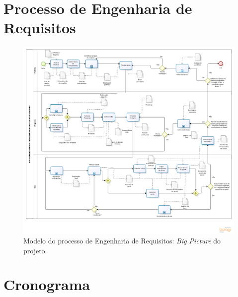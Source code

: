 \begin{apendicesenv}
  
  \chapter{Processo de Engenharia de Requisitos}
  
    \begin{figure}[!htbp]
      \centering
      \includegraphics[scale=0.46, angle = 90]{figuras/project_big_picture}
      \caption[Modelo do processo de Engenharia de Requisitos]
	  {Modelo do processo de Engenharia de Requisitos: \textit{Big Picture} do projeto.}
      \label{project_big_picture}
    \end{figure}
  
  \chapter{Cronograma}
  

\end{apendicesenv}
